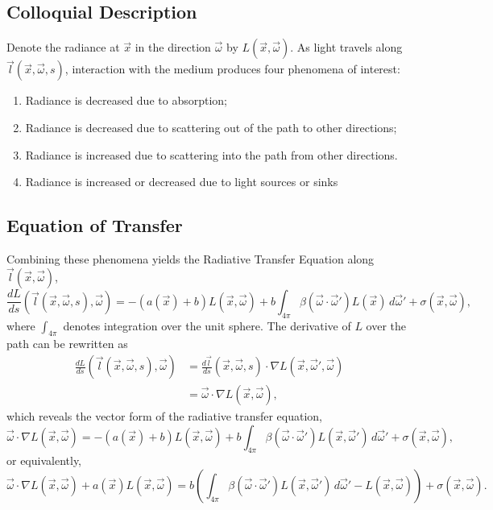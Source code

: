 \subsection{Colloquial Description}
Denote the radiance at $\vec{x}$ in the direction $\vec{\omega}$ by $L(\vec{x}, \vec{\omega})$.
As light travels along $\vec{l}(\vec{x}, \vec{\omega}, s)$, interaction with the
medium produces four phenomena of interest:
\begin{enumerate}
  \item Radiance is decreased due to absorption;
  \item Radiance is decreased due to scattering out of the path to other
    directions;
  \item Radiance is increased due to scattering into the path from other
      directions.
  \item Radiance is increased or decreased due to light sources or sinks
\end{enumerate}

\subsection{Equation of Transfer}
Combining these phenomena yields the Radiative Transfer Equation along
$\vec{l}(\vec{x}, \vec{\omega})$,
\begin{equation}
  \label{eqn:rte1d}
  \frac{dL}{ds}(\vec{l}(\vec{x}, \vec{\omega}, s), \vec{\omega})
  = -(a(\vec{x}) + b)L(\vec{x}, \vec{\omega})
  + b \int_{4\pi} \beta(\vec{\omega}\cdot\vec{\omega}') L(\vec{x})\, d\vec{\omega}' + \sigma(\vec{x}, \vec{\omega}),
\end{equation}
where $\int_{4\pi}$ denotes integration over the unit sphere.
The derivative of $L$ over the path can be rewritten as
\begin{align*}
  \frac{dL}{ds}(\vec{l}(\vec{x}, \vec{\omega}, s), \vec{\omega})
    &= \frac{d\vec{l}}{ds}(\vec{x}, \vec{\omega}, s) \cdot \nabla L(\vec{x}, \vec{\omega}', \vec{\omega}) \\
    &= \vec{\omega} \cdot \nabla L(\vec{x}, \vec{\omega}),
\end{align*}
which reveals the vector form of the radiative transfer equation,
\begin{equation*}
  \vec{\omega} \cdot \nabla L(\vec{x}, \vec{\omega})
  = -(a(\vec{x}) + b)L(\vec{x}, \vec{\omega})
  + b \int_{4\pi} \beta(\vec{\omega}\cdot\vec{\omega}') L(\vec{x}, \vec{\omega}')\, d\vec{\omega}' + \sigma(\vec{x}, \vec{\omega}),
\end{equation*}
or equivalently,
\begin{equation}
  \vec{\omega} \cdot \nabla L(\vec{x}, \vec{\omega})
  + a(\vec{x})L(\vec{x}, \vec{\omega})
  = b \left(
    \int_{4\pi} \beta(\vec{\omega}\cdot\vec{\omega}') L(\vec{x}, \vec{\omega}')\, d\vec{\omega}'
    - L(\vec{x}, \vec{\omega})
  \right)+ \sigma(\vec{x}, \vec{\omega}).
  \label{eqn:rte}
\end{equation}

